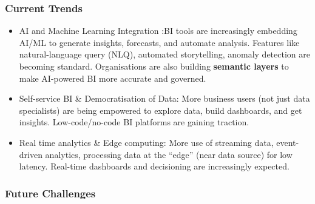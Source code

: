 \subsubsection{Current Trends}


\begin{itemize}
    \item AI and Machine Learning Integration :BI tools are increasingly embedding AI/ML to generate insights, forecasts, and automate analysis. Features like natural-language query (NLQ), automated storytelling, anomaly detection are becoming standard. Organisations are also building \textbf{semantic layers} to make AI-powered BI more accurate and governed.
    \item Self-service BI \& Democratisation of Data: More business users (not just data specialists) are being empowered to explore data, build dashboards, and get insights. Low-code/no-code BI platforms are gaining traction.
    \item Real time analytics \& Edge computing: More use of streaming data, event-driven analytics, processing data at the “edge” (near data source) for low latency. Real-time dashboards and decisioning are increasingly expected.
\end{itemize}

\subsubsection{Future Challenges}

